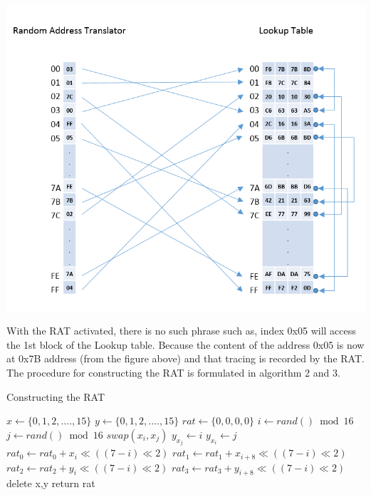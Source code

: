 \documentclass[3p]{elsarticle}
\begin{document}
\begin{center}
\includegraphics[scale=0.38,natwidth=785,natheight=666]{Figures/rat-scrambled(new).png}
\label{fig: Random Address Translator Scrambled.}
\end{center}

With the RAT activated, there is no such phrase such as, index 0x05 will access the 1st block of the Lookup table. Because the content of the address 0x05 is now at 0x7B address (from the figure above) and that tracing is recorded by the RAT. The procedure for constructing the RAT is formulated in algorithm 2 and 3.

\begin{algorithm}
	\caption{Constructing the RAT}
	\label{Constructing the RAT}

	\begin{algorithmic}[1]
	
	\State $x\gets \{0,1,2,....,15\}$
	\State $y\gets \{0,1,2,....,15\}$
	\State $rat\gets\{0,0,0,0\}$
		\State $i\gets rand() \bmod 16$
		\State $j\gets rand() \bmod 16$
		\State $swap(x_i,x_j)$
		\State $y_{x_j}\gets i$
		\State $y_{x_i}\gets j$
	\EndFor
		\State $rat_0 \gets rat_0 + x_i\ll((7-i)\ll2)$
		\State $rat_1 \gets rat_1 + x_{i+8}\ll((7-i)\ll2)$
		\State $rat_2 \gets rat_2 + y_i\ll((7-i)\ll2)$
		\State $rat_3 \gets rat_3 + y_{i+8}\ll((7-i)\ll2)$
	\EndFor
	\State delete x,y
	\State return rat
	
	\EndFunction	
	\end{algorithmic}
\end{algorithm}
\end{document}
